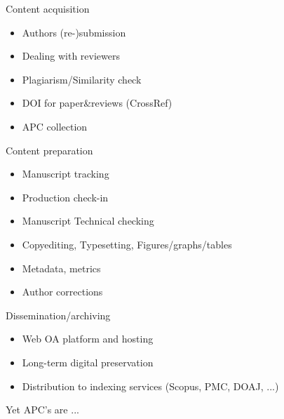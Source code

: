 \documentclass[10pt,compress,serif,aspectratio=169]{beamer}
\begin{document}
\begin{frame}[t]%
 \vskip1cm%

   Content acquisition
   \begin{itemize}
   \item Authors (re-)submission
   \item Dealing with reviewers
   \item Plagiarism/Similarity check
   \item DOI for paper\&reviews (CrossRef)
   \item APC collection
   \end{itemize}
   \pause
   Content preparation
   \begin{itemize}
   \item Manuscript tracking
   \item Production check-in
   \item Manuscript Technical checking
   \item Copyediting, Typesetting, Figures/graphs/tables
   \item Metadata, metrics
   \item Author corrections
   \end{itemize}
   \pause
   Dissemination/archiving
   \begin{itemize}
   \item Web OA platform and hosting
   \item Long-term digital preservation
   \item Distribution to indexing services (Scopus, PMC, DOAJ, ...)
   \end{itemize}
\end{frame}


\begin{frame}[t]%
 \vskip1cm%

 \alert{Yet APC's are ...}\\
 \pause
\end{frame}


\begin{frame}[t]%
 \vskip1cm%
 \begin{center}%
 \end{center}%
\end{frame}
 
\end{document}

